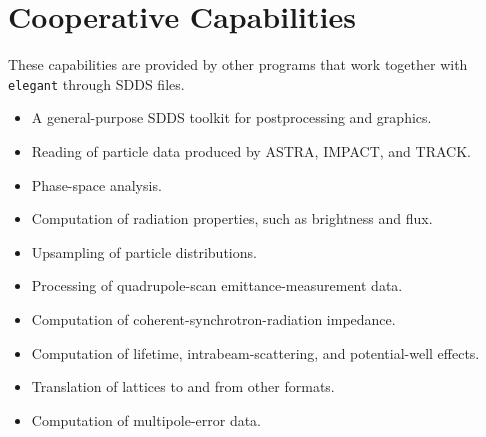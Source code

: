 \documentclass[11pt]{article}
\newcommand{\elegant}{\texttt{elegant}}
\newcommand{\sdds}{SDDS}
\begin{document}
\section{Cooperative Capabilities}

These capabilities are provided by other programs that work together with
\elegant{} through \sdds{} files.

\begin{itemize}
  \item A general-purpose \sdds{} toolkit for postprocessing and graphics.
  \item Reading of particle data produced by ASTRA, IMPACT, and TRACK.
  \item Phase-space analysis.
  \item Computation of radiation properties, such as brightness and flux.
  \item Upsampling of particle distributions.
  \item Processing of quadrupole-scan emittance-measurement data.
  \item Computation of coherent-synchrotron-radiation impedance.
  \item Computation of lifetime, intrabeam-scattering, and potential-well
        effects.
  \item Translation of lattices to and from other formats.
  \item Computation of multipole-error data.
\end{itemize}

\nocite{SDDS1,SDDS2,Halbach_69a,Huang2004,Xiao2007SC,Xiao2008a,Xiao2010a,Warnock,Elleaume1992,ASTRA,IMPACT,TRACK}


\end{document}

